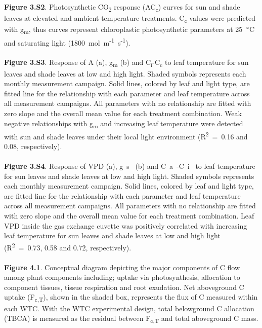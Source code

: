 \documentclass[a4paper]{article}
\begin{document}
\\
\\
\textbf{Figure 3.S2}. Photosynthetic CO\textsubscript{2} response (AC\textsubscript{c}) curves for sun and shade leaves at elevated and ambient temperature treatments. C\textsubscript{c} values were predicted with g\textsubscript{m}, thus curves represent chloroplastic photosynthetic parameters at 25~$\degree$C and saturating light (1800~{\textmugreek}mol~m\textsuperscript{-1}~s\textsuperscript{-1}). 
\\
\\
\textbf{Figure 3.S3}. Response of A (a), g\textsubscript{m} (b) and C\textsubscript{i}-C\textsubscript{c} to leaf temperature for sun leaves and shade leaves at low and high light. Shaded symbols represents each monthly measurement campaign. Solid lines, colored by leaf and light type, are fitted line for the relationship with each parameter and leaf temperature across all measurement campaigns. All parameters with no relationship are fitted with zero slope and the overall mean value for each treatment combination. Weak negative relationships with g\textsubscript{m} and increasing leaf temperature were detected with sun and shade leaves under their local light environment (R\textsuperscript{2}~=~0.16 and 0.08, respectively). 
\\
\\
\textbf{Figure 3.S4}. Response of VPD (a), g~s~ (b) and C~a~-C~i~ to leaf temperature for sun leaves and shade leaves at low and high light. Shaded symbols represents each monthly measurement campaign. Solid lines, colored by leaf and light type, are fitted line for the relationship with each parameter and leaf temperature across all measurement campaigns. All parameters with no relationship are fitted with zero slope and the overall mean value for each treatment combination. Leaf VPD inside the gas exchange cuvette was positively correlated with increasing leaf temperature for sun leaves and shade leaves at low and high light (R\textsuperscript{2}~=~0.73, 0.58 and 0.72, respectively).
\\
\\
\textbf{Figure 4.1}. Conceptual diagram depicting the major components of C flow among plant components including; uptake via photosynthesis, allocation to component tissues, tissue respiration and root exudation. Net aboveground C uptake (F\textsubscript{c,T}), shown in the shaded box, represents the flux of C measured within each WTC. With the WTC experimental design, total belowground C allocation (TBCA) is measured as the residual between F\textsubscript{c,T} and total aboveground C mass. 
\end{document}
